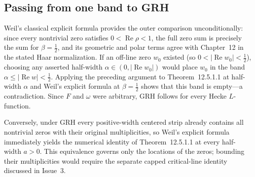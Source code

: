 \documentclass[11pt,letterpaper]{article}
\DeclareMathOperator{\RePt}{Re}
\begin{document}
\subsection*{Passing from one band to GRH}

Weil's classical explicit formula provides the outer comparison unconditionally: since every nontrivial zero satisfies $0 < \RePt\rho < 1$, the full zero sum is precisely the sum for $\beta = \tfrac12$, and its geometric and polar terms agree with Chapter~12 in the stated Haar normalization. If an off-line zero $w_0$ existed (so $0 < |\RePt w_0| < \tfrac12$), choosing any asserted half-width $\alpha \in (0, |\RePt w_0|)$ would place $w_0$ in the band $\alpha \le |\RePt w| < \tfrac12$. Applying the preceding argument to Theorem~12.5.1.1 at half-width $\alpha$ and Weil's explicit formula at $\beta = \tfrac12$ shows that this band is empty---a contradiction. Since $F$ and $\omega$ were arbitrary, GRH follows for every Hecke $L$-function.

Conversely, under GRH every positive-width centered strip already contains all nontrivial zeros with their original multiplicities, so Weil's explicit formula immediately yields the numerical identity of Theorem~12.5.1.1 at every half-width $a>0$. This equivalence governs only the locations of the zeros; bounding their multiplicities would require the separate capped critical-line identity discussed in Issue~3.
\end{document}
